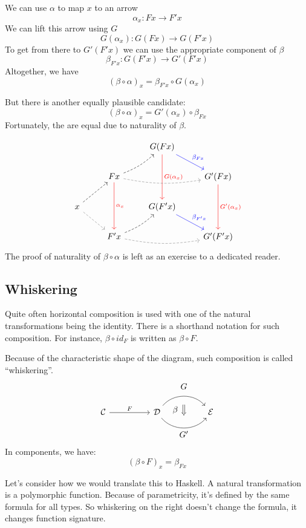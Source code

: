 \documentclass[DaoFP]{subfiles}
\begin{document}
We can use $\alpha$ to map $x$ to an arrow 
\[ \alpha_x \colon F x \to F' x \]
We can lift this arrow using $G$
\[ G (\alpha_x) \colon G (F x) \to G (F' x) \]
To get from there to $G' (F' x)$ we can use the appropriate component of $\beta$
\[ \beta_{F' x} \colon G (F' x) \to G' (F' x) \]
Altogether, we have
\[ (\beta \circ \alpha)_x = \beta_{F' x} \circ G (\alpha_x) \]

But there is another equally plausible candidate: 
\[ (\beta \circ \alpha)_x = G'(\alpha_x) \circ \beta_{F x}\]
Fortunately, the are equal due to naturality of $\beta$. 

\[
 \begin{tikzcd}
  && G(F x)
  \arrow[dd, red, "G(\alpha_x)"]
  \arrow[dr, blue, "\beta_{F x}"]
  \\
  & F x
  \arrow[rr, bend right=10, dashed, gray]
  \arrow[ur, bend right=10, dashed]
  \arrow[dd, red, "\alpha_x"]
 && G' (F x)
  \arrow[dd, red, "G'(\alpha_x)"]
 \\
 x
 \arrow[ur, dashed]
 \arrow[dr, gray, dashed]
 && G(F' x)
  \arrow[dr, blue, "\beta_{F' x}"]
 \\
 &F' x
  \arrow[rr, bend right=10, dashed, gray]
 \arrow[ur, bend right=10, dashed]
 && G'(F' x)
\end{tikzcd}
\]
The proof of naturality of $\beta \circ \alpha$ is left as an exercise to a dedicated reader.

\subsection{Whiskering}

Quite often horizontal composition is used with one of the natural transformations being the identity. There is a shorthand notation for such composition. For instance, $\beta \circ id_F$ is written as $\beta \circ F$. 

Because of the characteristic shape of the diagram, such composition is called ``whiskering''.
\[
\begin{tikzcd}[column sep=huge]
\mathcal{C}
 \arrow[r, "F"]
 &
\mathcal{D}
  \arrow[bend left=50]{r}[name=U1, label=above:$G$]{}
  \arrow[bend right=50]{r}[name=D1, label=below:$G'$]{} 
 &
\mathcal{E}
  \arrow[shorten <=10pt,shorten >=10pt,Rightarrow,to path={(U1) -- node[label=left:$\beta$] {} (D1)}]{}
\end{tikzcd}
\]
In components, we have:
\[ (\beta \circ F)_x = \beta_{F x} \]

Let's consider how we would translate this to Haskell. A natural transformation is a polymorphic function. Because of parametricity, it's defined by the same formula for all types. So whiskering on the right doesn't change the formula, it changes function signature. 
\end{document}
